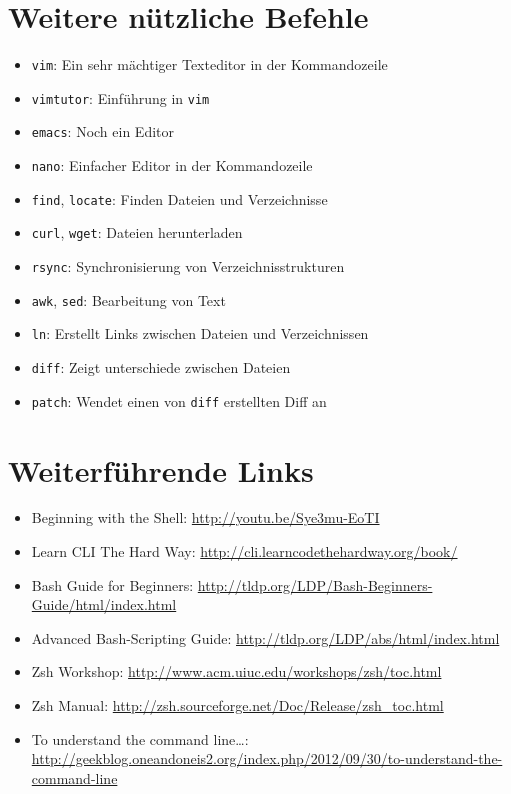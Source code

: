 \section{Weitere nützliche Befehle}
\begin{itemize}
  \item \texttt{vim}: Ein sehr mächtiger Texteditor in der Kommandozeile
  \item \texttt{vimtutor}: Einführung in \texttt{vim}
  \item \texttt{emacs}: Noch ein Editor
  \item \texttt{nano}: Einfacher Editor in der Kommandozeile
  \item \texttt{find}, \texttt{locate}: Finden Dateien und Verzeichnisse
  \item \texttt{curl}, \texttt{wget}: Dateien herunterladen
  \item \texttt{rsync}: Synchronisierung von Verzeichnisstrukturen
  \item \texttt{awk}, \texttt{sed}: Bearbeitung von Text
  \item \texttt{ln}: Erstellt Links zwischen Dateien und Verzeichnissen
  \item \texttt{diff}: Zeigt  unterschiede zwischen Dateien
  \item \texttt{patch}: Wendet einen von \texttt{diff} erstellten Diff an
\end{itemize}

\section{Weiterführende Links}
\begin{itemize}
  \item Beginning with the Shell: \url{http://youtu.be/Sye3mu-EoTI}
  \item Learn CLI The Hard Way: \url{http://cli.learncodethehardway.org/book/}
  \item Bash Guide for Beginners: \url{http://tldp.org/LDP/Bash-Beginners-Guide/html/index.html}
  \item Advanced Bash-Scripting Guide: \url{http://tldp.org/LDP/abs/html/index.html}
  \item Zsh Workshop: \url{http://www.acm.uiuc.edu/workshops/zsh/toc.html}
  \item Zsh Manual: \url{http://zsh.sourceforge.net/Doc/Release/zsh\_toc.html}
  \item To understand the command line…: \url{http://geekblog.oneandoneis2.org/index.php/2012/09/30/to-understand-the-command-line}
\end{itemize}

